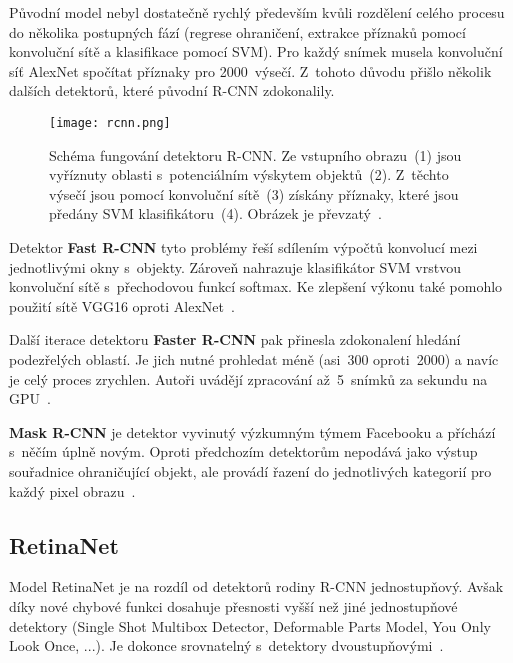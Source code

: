 Původní model nebyl dostatečně rychlý především kvůli rozdělení celého procesu do několika postupných fází (regrese ohraničení, extrakce příznaků pomocí konvoluční sítě a klasifikace pomocí SVM). Pro každý snímek musela konvoluční síť AlexNet spočítat příznaky pro 2000~výsečí. Z~tohoto důvodu přišlo několik dalších detektorů, které původní R-CNN zdokonalily.

\begin{figure}[H]
    \centering
    \texttt{[image: rcnn.png]}
    \caption[Schéma fungování detektoru R-CNN]{Schéma fungování detektoru R-CNN. Ze vstupního obrazu~(1) jsou vyříznuty oblasti s~potenciálním výskytem objektů~(2). Z~těchto výsečí jsou pomocí konvoluční sítě~(3) získány příznaky, které jsou předány SVM klasifikátoru~(4). Obrázek je převzatý~\cite{paperRcnn}.}
    \label{fig_rcnn}
\end{figure}

Detektor \textbf{Fast R-CNN} tyto problémy řeší sdílením výpočtů konvolucí mezi jednotlivými okny s~objekty. Zároveň nahrazuje klasifikátor SVM vrstvou konvoluční sítě s~přechodovou funkcí softmax. Ke zlepšení výkonu také pomohlo použití sítě VGG16 oproti AlexNet~\cite{paperFastRcnn}.

Další iterace detektoru \textbf{Faster R-CNN} pak přinesla zdokonalení hledání podezřelých oblastí. Je jich nutné prohledat méně (asi~300 oproti~2000) a navíc je celý proces zrychlen. Autoři uvádějí zpracování až~5~snímků za sekundu na GPU~\cite{paperFasterRcnn}.

\textbf{Mask R-CNN} je detektor vyvinutý výzkumným týmem Facebooku a příchází s~něčím úplně novým. Oproti předchozím detektorům nepodává jako výstup souřadnice ohraničující objekt, ale provádí řazení do jednotlivých kategorií pro každý pixel obrazu~\cite{paperMaskRcnn}.


\subsection*{RetinaNet}

Model RetinaNet je na rozdíl od detektorů rodiny R-CNN jednostupňový. Avšak díky nové chybové funkci dosahuje přesnosti vyšší než jiné jednostupňové detektory (Single Shot Multibox Detector, Deformable Parts Model, You Only Look Once, ...). Je dokonce srovnatelný s~detektory dvoustupňovými~\cite{paperFocalLoss}.

